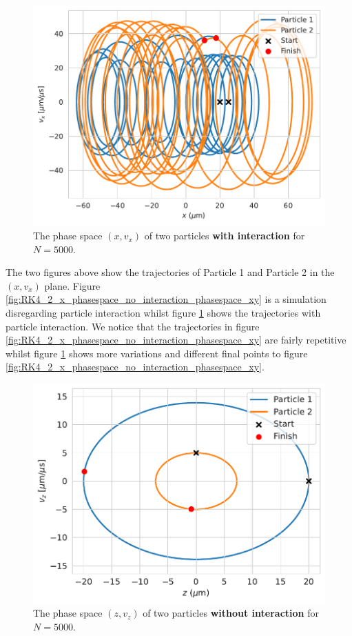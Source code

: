 \documentclass[english,notitlepage,reprint,nofootinbib]{revtex4-1}  %
\begin{document}
\begin{figure}[H]
    \centering
    \includegraphics[width=.5\textwidth]{../figures/phase_space_x_interaction_RK4_N5000.pdf}
    \caption{The phase space $(x, v_x)$ of two particles \textbf{with interaction} for $N = 5000$.}
    \label{fig:RK4_2_x_phasespace_with_interaction_phasespace_xy}
\end{figure}
The two figures above show the trajectories of Particle 1 and Particle 2 in the $(x,v_x)$ plane.
Figure \ref{fig:RK4_2_x_phasespace_no_interaction_phasespace_xy} is a simulation disregarding particle interaction whilst
figure \ref{fig:RK4_2_x_phasespace_with_interaction_phasespace_xy} shows the trajectories with particle interaction. We
notice that the trajectories in figure \ref{fig:RK4_2_x_phasespace_no_interaction_phasespace_xy} are fairly repetitive whilst
figure \ref{fig:RK4_2_x_phasespace_with_interaction_phasespace_xy} shows more variations and different final points to figure
\ref{fig:RK4_2_x_phasespace_no_interaction_phasespace_xy}.

\begin{figure}[H]
    \centering
    \includegraphics[width=.5\textwidth]{../figures/phase_space_z_RK4_N5000.pdf}
    \caption{The phase space $(z, v_z)$ of two particles \textbf{without interaction} for $N = 5000$.}
    \label{fig:K4_2_z_phasespace_no_interaction_phasespace_xy}
\end{figure}
\end{document}
